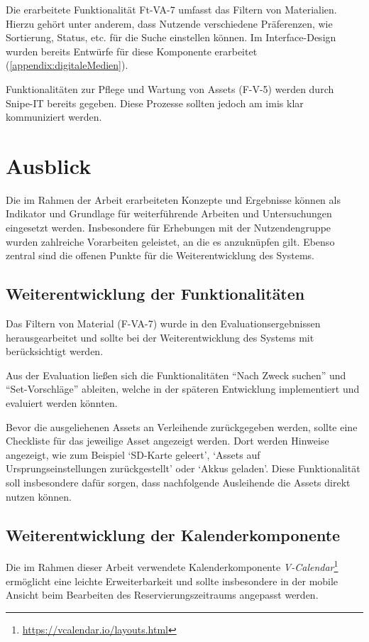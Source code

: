 Die erarbeitete Funktionalität Ft-VA-7 umfasst das Filtern von Materialien. Hierzu gehört unter
anderem, dass Nutzende verschiedene Präferenzen, wie Sortierung, Status, etc. für die Suche
einstellen können. Im Interface-Design wurden bereits Entwürfe für diese Komponente erarbeitet
(\ref{appendix:digitaleMedien}).

Funktionalitäten zur Pflege und Wartung von Assets (F-V-5) werden durch Snipe-IT bereits gegeben.
Diese Prozesse sollten jedoch am \ac{imis} klar kommuniziert werden.


\section{Ausblick}
Die im Rahmen der Arbeit erarbeiteten Konzepte und Ergebnisse können als Indikator und Grundlage für
weiterführende Arbeiten und Untersuchungen eingesetzt werden. Insbesondere für Erhebungen mit der
Nutzendengruppe wurden zahlreiche Vorarbeiten geleistet, an die es anzuknüpfen gilt. Ebenso zentral
sind die offenen Punkte für die Weiterentwicklung des Systems.

\subsection{Weiterentwicklung der Funktionalitäten}
Das Filtern von Material (F-VA-7) wurde in den Evaluationsergebnissen
herausgearbeitet und sollte bei der Weiterentwicklung des Systems mit
berücksichtigt werden.

Aus der Evaluation ließen sich die Funktionalitäten \enquote{Nach Zweck suchen}
und \enquote{Set-Vorschläge} ableiten, welche in der späteren Entwicklung
implementiert und evaluiert werden könnten.

Bevor die ausgeliehenen Assets an Verleihende zurückgegeben werden, sollte eine
Checkliste für das jeweilige Asset angezeigt  werden. Dort werden Hinweise angezeigt,
wie zum Beispiel \enquote*{SD-Karte geleert}, \enquote*{Assets auf Ursprungseinstellungen
    zurückgestellt} oder \enquote*{Akkus geladen}. Diese Funktionalität soll insbesondere dafür
sorgen, dass nachfolgende Ausleihende die Assets direkt nutzen können.

\subsection{Weiterentwicklung der Kalenderkomponente}
Die im Rahmen dieser Arbeit verwendete Kalenderkomponente
\textit{V-Calendar}\footnote{\url{https://vcalendar.io/layouts.html}} ermöglicht
eine leichte Erweiterbarkeit und sollte insbesondere in der mobile Ansicht beim
Bearbeiten des Reservierungszeitraums angepasst werden.

